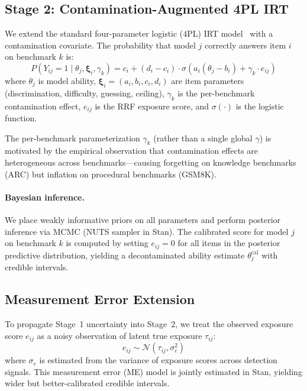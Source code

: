 \documentclass[11pt,a4paper]{article}
\begin{document}
\subsection{Stage 2: Contamination-Augmented 4PL IRT}

We extend the standard four-parameter logistic (4PL) IRT model~\citep{deboeck2004explanatory} with a contamination covariate. The probability that model $j$ correctly answers item $i$ on benchmark $k$ is:
\begin{equation}
P(Y_{ij}=1 \mid \theta_j, \boldsymbol{\xi}_i, \gamma_k) = c_i + (d_i - c_i) \cdot \sigma\!\left(a_i(\theta_j - b_i) + \gamma_k \cdot e_{ij}\right)
\label{eq:4pl_gamma}
\end{equation}
where $\theta_j$ is model ability, $\boldsymbol{\xi}_i = (a_i, b_i, c_i, d_i)$ are item parameters (discrimination, difficulty, guessing, ceiling), $\gamma_k$ is the per-benchmark contamination effect, $e_{ij}$ is the RRF exposure score, and $\sigma(\cdot)$ is the logistic function.

The per-benchmark parameterization $\gamma_k$ (rather than a single global $\gamma$) is motivated by the empirical observation that contamination effects are heterogeneous across benchmarks---causing forgetting on knowledge benchmarks (ARC) but inflation on procedural benchmarks (GSM8K).

\paragraph{Bayesian inference.}
We place weakly informative priors on all parameters and perform posterior inference via MCMC (NUTS sampler in Stan). The calibrated score for model $j$ on benchmark $k$ is computed by setting $e_{ij}=0$ for all items in the posterior predictive distribution, yielding a decontaminated ability estimate $\theta_j^{\text{cal}}$ with credible intervals.

\subsection{Measurement Error Extension}

To propagate Stage~1 uncertainty into Stage~2, we treat the observed exposure score $e_{ij}$ as a noisy observation of latent true exposure $\tau_{ij}$:
\begin{equation}
e_{ij} \sim \mathcal{N}(\tau_{ij}, \sigma_e^2)
\end{equation}
where $\sigma_e$ is estimated from the variance of exposure scores across detection signals. This measurement error (ME) model is jointly estimated in Stan, yielding wider but better-calibrated credible intervals.
\end{document}
